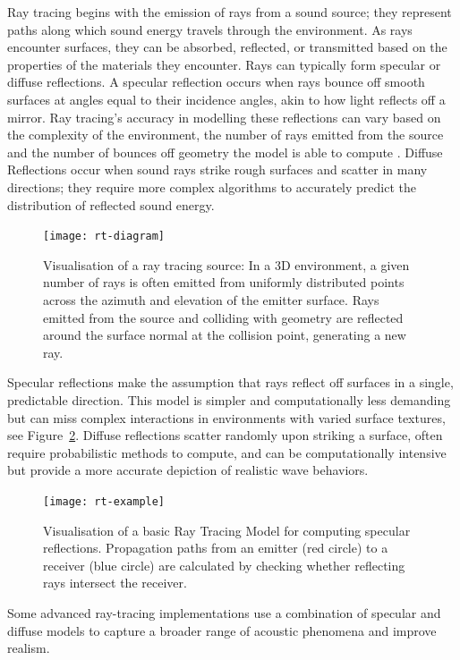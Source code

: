 Ray tracing begins with the emission of rays from a sound source; they represent paths along which sound energy travels through the environment. As rays encounter surfaces, they can be absorbed, reflected, or transmitted based on the properties of the materials they encounter. Rays can typically form specular or diffuse reflections. A specular reflection occurs when rays bounce off smooth surfaces at angles equal to their incidence angles, akin to how light reflects off a mirror. Ray tracing's accuracy in modelling these reflections can vary based on the complexity of the environment, the number of rays emitted from the source and the number of bounces off geometry the model is able to compute 
\citep{thompsonRayTracing}.
Diffuse Reflections occur when sound rays strike rough surfaces and scatter in many directions; they require more complex algorithms to accurately predict the distribution of reflected sound energy.
\begin{figure}[htbp]
    \centering
    \texttt{[image: rt-diagram]}
    \caption[Ray Tracing source visualisation]{Visualisation of a ray tracing source: In a 3D environment, a given number of rays is often emitted from uniformly distributed points across the azimuth and elevation of the emitter surface. Rays emitted from the source and colliding with geometry are reflected around the surface normal at the collision point, generating a new ray.}\label{fig:ray-tracing-diagram}
\end{figure}
Specular reflections make the assumption that rays reflect off surfaces in a single, predictable direction. This model is simpler and computationally less demanding but can miss complex interactions in environments with varied surface textures, see Figure~\ref{fig:ray-tracing-diagram2}.
Diffuse reflections scatter randomly upon striking a surface, often require probabilistic methods to compute, and can be computationally intensive but provide a more accurate depiction of realistic wave behaviors.
\begin{figure}[htbp]
    \centering
    \texttt{[image: rt-example]}
    \caption[Ray Tracing Model Visualisation]{Visualisation of a basic Ray Tracing Model for computing specular reflections. Propagation paths from an emitter (red circle) to a receiver (blue circle) are calculated by checking whether reflecting rays intersect the receiver.}\label{fig:ray-tracing-diagram2}
\end{figure}
Some advanced ray-tracing implementations use a combination of specular and diffuse models to capture a broader range of acoustic phenomena and improve realism.
